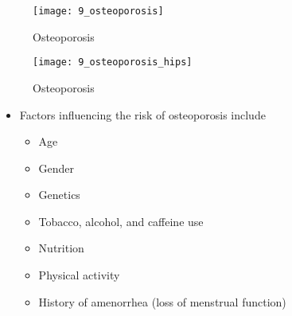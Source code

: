 \documentclass[title={Chapter 9}]{fdsn201notes}
\begin{document}
\begin{figure}[H]
	\centering
	\texttt{[image: 9\_osteoporosis]}
	\caption{Osteoporosis}
	\label{fig:osteoporosis}
\end{figure}

\begin{figure}[H]
	\centering
	\texttt{[image: 9\_osteoporosis\_hips]}
	\caption{Osteoporosis}
	\label{fig:osteoporosis-hips}
\end{figure}

\begin{itemize}
	\item Factors influencing the risk of osteoporosis include
	\begin{itemize}
		\item Age
		\item Gender
		\item Genetics
		\item Tobacco, alcohol, and caffeine use
		\item Nutrition
		\item Physical activity
		\item History of amenorrhea (loss of menstrual function)
	\end{itemize}
\end{itemize}
\end{document}
